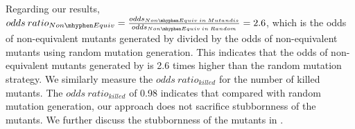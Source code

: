 Regarding our results, $odds\: ratio_{Non\mhyphen Equiv}=\frac{odds_{Non\mhyphen Equiv\: in\: Mutandis}}{odds_{Non\mhyphen Equiv\: in\: Random}}=2.6$, which is the odds of non-equivalent mutants generated by \mutandis divided by the odds of non-equivalent mutants using random mutation generation. This indicates that the odds of non-equivalent
mutants generated by \mutandis is 2.6 times higher than the random mutation strategy. We similarly measure the $odds\: ratio_{killed}$ for the number of killed mutants. The $odds\: ratio_{killed}$ of 0.98 indicates that compared with random mutation generation, our approach does not sacrifice stubbornness of the mutants. We further discuss the stubbornness of the mutants in .          


   



